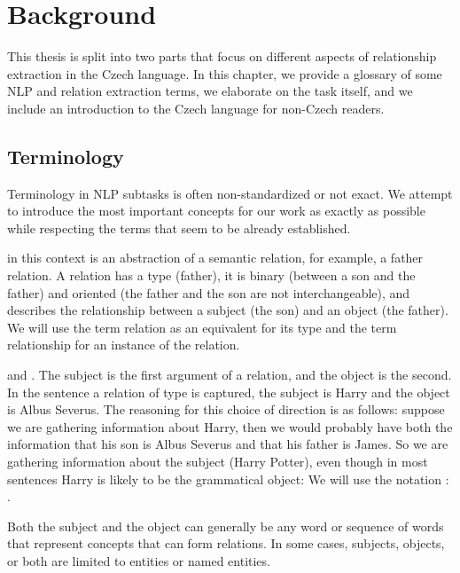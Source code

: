 \chapter{Background}

This thesis is split into two parts that focus on different aspects of relationship extraction in the Czech language. In this chapter, we provide a glossary of some NLP and relation extraction terms, we elaborate on the task itself, and we include an introduction to the Czech language for non-Czech readers.


\section{Terminology}
Terminology in NLP subtasks is often non-standardized or not exact. We attempt to introduce the most important concepts for our work as exactly as possible while respecting the terms that seem to be already established. 


 in this context is an abstraction of a semantic relation, for example, a father relation. A relation has a type (father), it is binary (between a son and the father) and oriented (the father and the son are not interchangeable), and describes the relationship between a subject (the son) and an object (the father). We will use the term relation as an equivalent for its type and the term relationship for an instance of the relation. 



 and . The subject is the first argument of a relation, and the object is the second. In the sentence  a relation of type  is captured, the subject is Harry and the object is Albus Severus. The reasoning for this choice of direction is as follows: suppose we are gathering information about Harry, then we would probably have both the information that his son is Albus Severus and that his father is James. So we are gathering information about the subject (Harry Potter), even though in most sentences Harry is likely to be the grammatical object:  We will use the notation : . 



Both the subject and the object can generally be any word or sequence of words that represent concepts that can form relations. In some cases, subjects, objects, or both are limited to entities or named entities.

